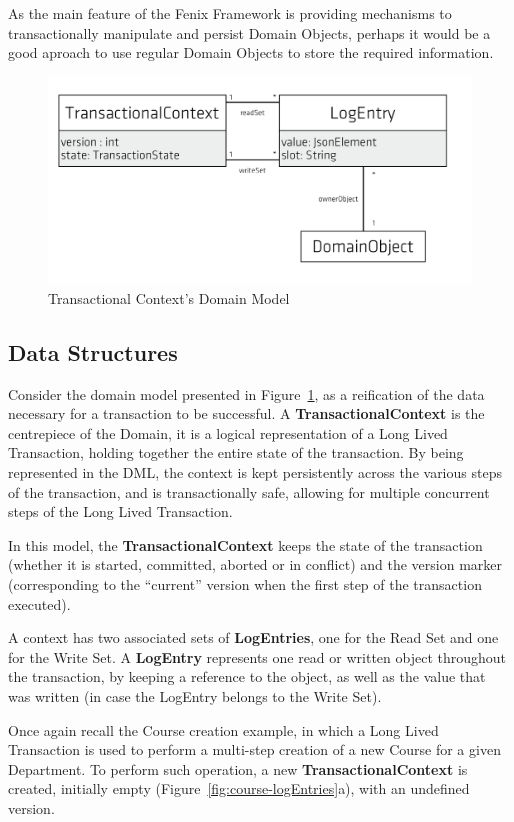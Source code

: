 As the main feature of the Fenix Framework is providing mechanisms to
transactionally manipulate and persist Domain Objects, perhaps it
would be a good aproach to use regular Domain Objects to store the
required information.


\begin{figure}
\centering
\includegraphics[width=0.8\linewidth]{tx-context}
\caption{Transactional Context's Domain Model}
\label{fig:transactionalContext}
\end{figure}



\subsection{Data Structures}

Consider the domain model presented in
Figure~\ref{fig:transactionalContext}, as a reification of the data
necessary for a transaction to be successful. A {\bf
  TransactionalContext} is the centrepiece of the Domain, it is a
logical representation of a Long Lived Transaction, holding together
the entire state of the transaction. By being represented in the DML,
the context is kept persistently across the various steps of the
transaction, and is transactionally safe, allowing for multiple
concurrent steps of the Long Lived Transaction.

In this model, the {\bf TransactionalContext} keeps the state of the
transaction (whether it is started, committed, aborted or in
conflict) and the version marker (corresponding to the ``current''
version when the first step of the transaction executed).

A context has two associated sets of {\bf LogEntries}, one for the
Read Set and one for the Write Set. A {\bf LogEntry} represents one
read or written object throughout the transaction, by keeping a
reference to the object, as well as the value that was written (in
case the LogEntry belongs to the Write Set).

Once again recall the Course creation example, in which a Long Lived
Transaction is used to perform a multi-step creation of a new Course
for a given Department. To perform such operation, a new {\bf
  TransactionalContext} is created, initially empty
(Figure~\ref{fig:course-logEntries}a), with an undefined version.

